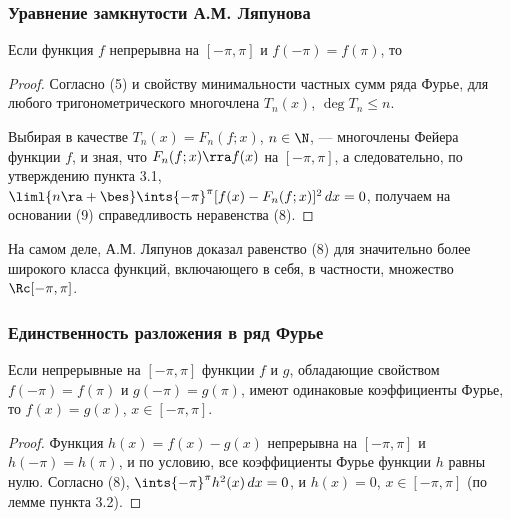 \documentclass[a4paper]{article}
\begin{document}
\subsubsection{Уравнение замкнутости А.М. Ляпунова}

\begin{theorem}
Если функция $f$ непрерывна на $[-\pi,\pi]$ и $f(-\pi)=f(\pi)$, то
\end{theorem}

\begin{proof}
Согласно (5) и свойству минимальности частных сумм ряда Фурье,
 для любого
тригонометрического многочлена $T_n(x)$, $\deg T_n\le n$.

Выбирая в качестве $T_n(x) = F_n(f;x)$, $n\in\N$, --- многочлены
Фейера функции $f$, и зная, что $F_n(f;x) \rra f(x)$ на
$[-\pi,\pi]$, а следовательно, по утверждению пункта 3.1,
$\liml{n\ra+\bes} \ints{-\pi}^{\pi} [f(x) - F_n(f;x)]^2\,dx=0$,
получаем на основании (9) справедливость неравенства (8).
\end{proof}

\begin{note}
На самом деле, А.М. Ляпунов доказал равенство (8) для значительно
более широкого класса функций, включающего в себя, в частности,
множество $\Rc[-\pi,\pi]$.
\end{note}

\subsubsection{Единственность разложения в ряд Фурье}

\begin{theorem}
Если непрерывные на $[-\pi,\pi]$ функции $f$ и $g$, обладающие
свойством $f(-\pi)=f(\pi)$ и $g(-\pi)=g(\pi)$, имеют одинаковые
коэффициенты Фурье, то $f(x)=g(x)$, $x\in[-\pi,\pi]$.
\end{theorem}

\begin{proof}
Функция $h(x) = f(x) - g(x)$ непрерывна на $[-\pi,\pi]$ и $h(-\pi) =
h(\pi)$, и по условию, все коэффициенты Фурье функции $h$ равны
нулю. Согласно (8), $\ints{-\pi}^{\pi} h^2(x)\,dx=0$, и $h(x)=0$,
$x\in[-\pi,\pi]$ (по лемме пункта 3.2).
\end{proof}
\end{document}

